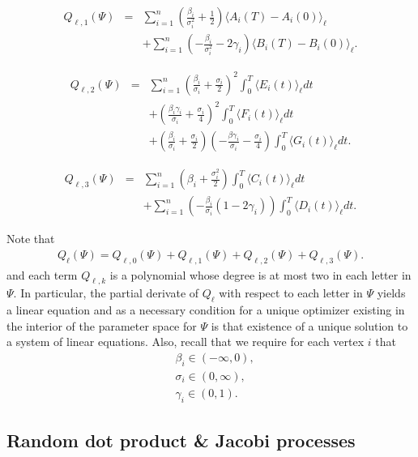 \documentclass[12pt]{article}%
\begin{document}
\begin{eqnarray*}
Q_{\ell,1}(\Psi) 
&=& \sum_{i=1}^n \left(\frac{\beta_i}{\sigma_i^2} + \frac{1}{2}\right) \langle A_i(T) - A_i(0) \rangle_\ell \\
&\ & +   \sum_{i=1}^n \left(-\frac{\beta_i}{\sigma_i^2} - 2\gamma_i\right)\langle B_i(T) - B_i(0) \rangle_\ell. 
\end{eqnarray*}


\begin{eqnarray*}
Q_{\ell,2}(\Psi) &=& \sum_{i=1}^n \left(\frac{\beta_i}{\sigma_i} + \frac{\sigma_i}{2}\right)^2 \int_0^T \langle E_i(t)\rangle_\ell dt  \\
&\ & + \left( \frac{\beta_i \gamma_i}{\sigma_i} + \frac{\sigma_i}{4}\right)^2
\int_0^T \langle F_i(t)\rangle_\ell dt  \\
&\ & + 
\left(\frac{\beta_i}{\sigma_i} + \frac{\sigma_i}{2}\right)
\left(-\frac{\beta \gamma_i}{\sigma_i} - \frac{\sigma_i}{4}\right)
\int_0^T \langle G_i(t) \rangle_\ell dt.
\end{eqnarray*}

\begin{eqnarray*}
Q_{\ell,3}(\Psi) &=& \sum_{i=1}^n \left( \beta_i + \frac{\sigma_i^2}{2}\right) \int_0^T \langle C_i(t) \rangle_\ell dt\\
&\ & + \sum_{i=1}^n \left(-\frac{\beta_i}{\sigma_i} (1-2\gamma_i) \right) \int_0^T \langle D_i(t) \rangle_\ell dt. 
\end{eqnarray*}

Note that 
\begin{eqnarray}
Q_\ell(\Psi) = 
Q_{\ell,0}(\Psi)+
Q_{\ell,1}(\Psi)+
Q_{\ell,2}(\Psi)+
Q_{\ell,3}(\Psi).
\end{eqnarray}
and each term $Q_{\ell,k}$ is a polynomial whose degree is at most two in each letter in $\Psi$.
In particular, the partial derivate of $Q_\ell$ with respect to each letter in $\Psi$ yields a linear equation and as a necessary condition for a unique optimizer existing in the interior of the parameter space for $\Psi$ is that existence of a unique solution to a system of linear equations. Also, recall that we require for each vertex $i$ that 
\begin{eqnarray}
&\beta_i \in (-\infty,0), \\
&\sigma_i \in (0,\infty), \\
&\gamma_i \in (0,1).
\end{eqnarray}


\subsection{Random dot product \& Jacobi processes}
\end{document}
